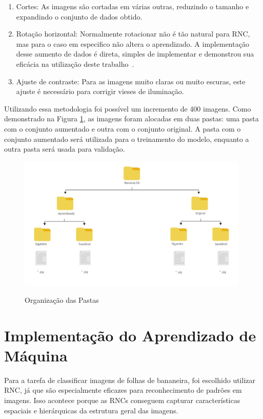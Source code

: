 \begin{enumerate}
    \item Cortes: As imagens são cortadas em várias outras, reduzindo o tamanho e expandindo o conjunto de dados obtido. 
    \item Rotação horizontal: Normalmente rotacionar não é tão natural para RNC, mas para o caso em especifico não altera o aprendizado. A implementação desse aumento de dados é direta, simples de implementar e demonstrou sua eficácia na utilização deste trabalho~\cite{DadosArt}.
    \item Ajuste de contraste: Para as imagens muito claras ou muito escuras, este ajuste é necessário para corrigir vieses de iluminação.  
\end{enumerate} 

Utilizando essa metodologia foi possível um incremento de 400 imagens. Como demonstrado na Figura \ref{fig:Pastas}, as imagens foram alocadas em duas pastas: uma pasta com o conjunto aumentado e outra com o conjunto original. A pasta com o conjunto aumentado será utilizada para o treinamento do modelo, enquanto a outra pasta será usada para validação.

\begin{figure}[!h]
	\centering
	\caption{Organização das Pastas}
	\includegraphics[width=11cm]{figuras/Pastas.png}\\
	\label{fig:Pastas}
\end{figure}

\section{Implementação do Aprendizado de Máquina}
Para a tarefa de classificar imagens de folhas de bananeira, foi escolhido utilizar \ac{RNC}, já que são especialmente eficazes para reconhecimento de padrões em imagens. Isso acontece porque as \ac{RNC}s conseguem capturar características espaciais e hierárquicas da estrutura geral das imagens.

